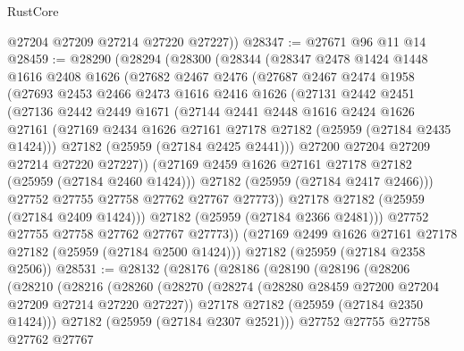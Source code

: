 \begin{lexlean}{RustCore}
\begin{coremodule}
        @27204
        @27209
        @27214
        @27220
        @27227))
@28347 := @27671 @96 @11 @14
@28459 := @28290
    (@28294
      (@28300
        (@28344
          (@28347
            @2478
            @1424
            @1448
            @1616
            @2408
            @1626
            (@27682
              @2467
              @2476
              (@27687
                @2467
                @2474
                @1958
                (@27693
                  @2453
                  @2466
                  @2473
                  @1616
                  @2416
                  @1626
                  (@27131
                    @2442
                    @2451
                    (@27136
                      @2442
                      @2449
                      @1671
                      (@27144
                        @2441
                        @2448
                        @1616
                        @2424
                        @1626
                        @27161
                        (@27169 @2434 @1626 @27161 @27178 @27182 (@25959 (@27184 @2435 @1424)))
                        @27182
                        (@25959 (@27184 @2425 @2441)))
                      @27200
                      @27204
                      @27209
                      @27214
                      @27220
                      @27227))
                  (@27169 @2459 @1626 @27161 @27178 @27182 (@25959 (@27184 @2460 @1424)))
                  @27182
                  (@25959 (@27184 @2417 @2466)))
                @27752
                @27755
                @27758
                @27762
                @27767
                @27773))
            @27178
            @27182
            (@25959 (@27184 @2409 @1424)))
          @27182
          (@25959 (@27184 @2366 @2481)))
        @27752
        @27755
        @27758
        @27762
        @27767
        @27773))
    (@27169 @2499 @1626 @27161 @27178 @27182 (@25959 (@27184 @2500 @1424)))
    @27182
    (@25959 (@27184 @2358 @2506))
@28531 := @28132
    (@28176
      (@28186
        (@28190
          (@28196
            (@28206
              (@28210
                (@28216
                  (@28260
                    (@28270
                      (@28274 (@28280 @28459 @27200 @27204 @27209 @27214 @27220 @27227))
                      @27178
                      @27182
                      (@25959 (@27184 @2350 @1424)))
                    @27182
                    (@25959 (@27184 @2307 @2521)))
                  @27752
                  @27755
                  @27758
                  @27762
                  @27767

\end{coremodule}
\end{lexlean}
